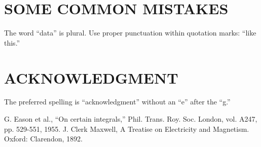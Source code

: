 \documentclass[conference]{IEEEtran}
\begin{document}
\section{SOME COMMON MISTAKES}
The word ``data'' is plural. Use proper punctuation within quotation marks: ``like this.'' 

\section*{ACKNOWLEDGMENT}
The preferred spelling is ``acknowledgment'' without an ``e'' after the ``g.''

\balance %

\begin{thebibliography}{9}
 G. Eason et al., ``On certain integrals,'' Phil. Trans. Roy. Soc. London, vol. A247, pp. 529-551, 1955.
 J. Clerk Maxwell, A Treatise on Electricity and Magnetism. Oxford: Clarendon, 1892.
\end{thebibliography}
\end{document}
